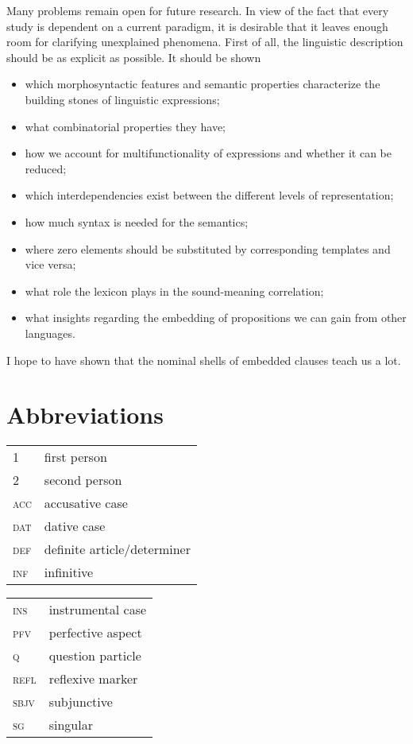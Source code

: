 \documentclass[output=paper]{langscibook}
\begin{document}
Many problems remain open for future research. In view of the fact that every study is dependent on a current paradigm, it is desirable that it leaves enough room for clarifying unexplained phenomena. First of all, the linguistic description should be as explicit as possible. It should be shown

\begin{itemize}
    \item which morphosyntactic features and semantic properties characterize the building stones of linguistic expressions;
    \item what combinatorial properties they have;
    \item how we account for multifunctionality of expressions and whether it can be reduced;
    \item which interdependencies exist between the different levels of representation;
    \item how much syntax is needed for the semantics;
    \item where zero elements should be substituted by corresponding templates and vice versa;
    \item what role the lexicon plays in the sound-meaning correlation;
    \item what insights regarding the embedding of propositions we can gain from other languages.
\end{itemize}

I hope to have shown that the nominal shells of embedded clauses teach us a lot.


\section*{Abbreviations}
\begin{tabularx}{.5\textwidth}{@{}lQ}
\textsc{1} & first person\\
\textsc{2} & second person\\
\textsc{acc} & accusative case\\
\textsc{dat} & dative case\\
\textsc{def} & definite article/determiner\\
\textsc{inf} & infinitive\\
\end{tabularx}%
\begin{tabularx}{.5\textwidth}{lQ@{}}
\textsc{ins} & instrumental case\\
\textsc{pfv} & perfective aspect\\
\textsc{q} & question particle\\
\textsc{refl} & reflexive marker\\
\textsc{sbjv} & subjunctive\\
\textsc{sg} & singular\\
\end{tabularx}
\end{document}

